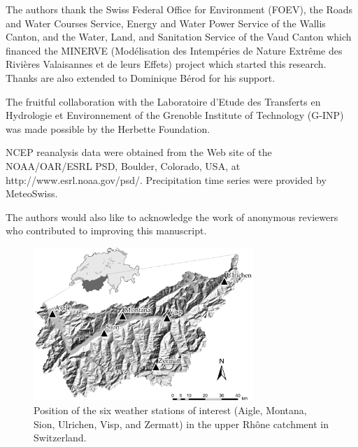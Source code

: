 \documentclass[hess, manuscript]{copernicus}
\begin{document}
	\begin{acknowledgements}
		The authors thank the Swiss Federal Office for Environment (FOEV), the Roads and Water Courses Service, Energy and Water Power Service of the Wallis Canton, and the Water, Land, and Sanitation Service of the Vaud Canton which financed the MINERVE (Mod\'{e}lisation des Intemp\'{e}ries de Nature Extr\^{e}me des Rivi\`{e}res Valaisannes et de leurs Effets) project which started this research. Thanks are also extended to Dominique B\'{e}rod for his support.

		The fruitful collaboration with the Laboratoire d'Etude des Transferts en Hydrologie et Environnement of the Grenoble Institute of Technology (G-INP) was made possible by the Herbette Foundation. 

		NCEP reanalysis data were obtained from the Web site of the NOAA/OAR/ESRL PSD, Boulder, Colorado, USA, at http://www.esrl.noaa.gov/psd/. Precipitation time series were provided by MeteoSwiss.

		The authors would also like to acknowledge the work of anonymous reviewers who contributed to improving this manuscript. 
	\end{acknowledgements}

	


	
	

	
	
	
	\begin{figure}[htb]
		\begin{center}
			\includegraphics[width=8.3cm]{fig01.pdf}
		\end{center}
		\caption{Position of the six weather stations of interest (Aigle, Montana, Sion, Ulrichen, Visp, and Zermatt) in the upper Rh\^{o}ne catchment in Switzerland.}
		\label{fig:map}
	\end{figure}
\end{document}
